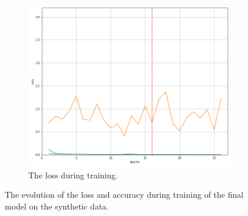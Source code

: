 \begin{figure}[!h]
\begin{subfigure}[t]{.45\textwidth}
        \includegraphics[width=\textwidth]{images/losses51ss2_0.png}
        \caption{The loss during training.}
        \label{fig:lossm22}
    \end{subfigure}

    \caption{The evolution of the loss and accuracy during training of the final model on the synthetic data.}
    \label{fig:lossaccm22}
\end{figure}

